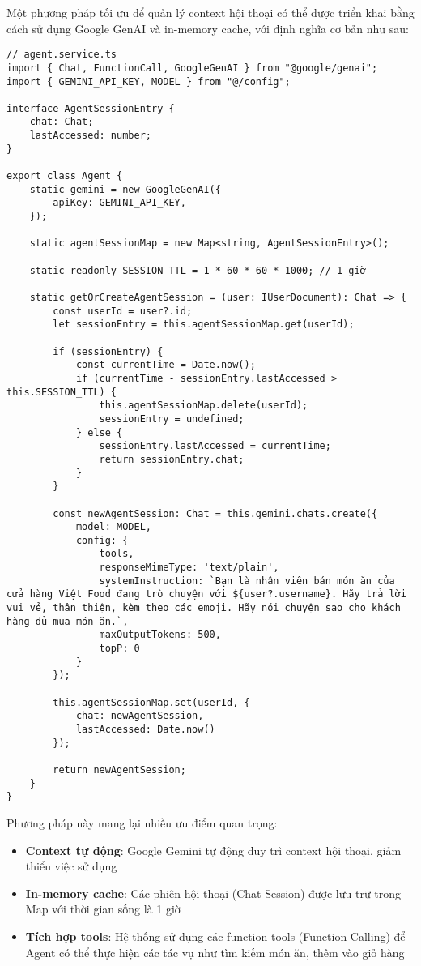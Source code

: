 Một phương pháp tối ưu để quản lý context hội thoại có thể được triển khai bằng cách sử dụng Google GenAI và in-memory cache, với định nghĩa cơ bản như sau:

\begin{verbatim}
// agent.service.ts
import { Chat, FunctionCall, GoogleGenAI } from "@google/genai";
import { GEMINI_API_KEY, MODEL } from "@/config";

interface AgentSessionEntry {
    chat: Chat;
    lastAccessed: number;
}

export class Agent {
    static gemini = new GoogleGenAI({
        apiKey: GEMINI_API_KEY,
    });

    static agentSessionMap = new Map<string, AgentSessionEntry>();

    static readonly SESSION_TTL = 1 * 60 * 60 * 1000; // 1 giờ

    static getOrCreateAgentSession = (user: IUserDocument): Chat => {
        const userId = user?.id;
        let sessionEntry = this.agentSessionMap.get(userId);

        if (sessionEntry) {
            const currentTime = Date.now();
            if (currentTime - sessionEntry.lastAccessed > this.SESSION_TTL) {
                this.agentSessionMap.delete(userId);
                sessionEntry = undefined;
            } else {
                sessionEntry.lastAccessed = currentTime;
                return sessionEntry.chat;
            }
        }

        const newAgentSession: Chat = this.gemini.chats.create({
            model: MODEL,
            config: {
                tools,
                responseMimeType: 'text/plain',
                systemInstruction: `Bạn là nhân viên bán món ăn của cửa hàng Việt Food đang trò chuyện với ${user?.username}. Hãy trả lời vui vẻ, thân thiện, kèm theo các emoji. Hãy nói chuyện sao cho khách hàng đủ mua món ăn.`,
                maxOutputTokens: 500,
                topP: 0
            }
        });

        this.agentSessionMap.set(userId, {
            chat: newAgentSession,
            lastAccessed: Date.now()
        });

        return newAgentSession;
    }
}
\end{verbatim}

Phương pháp này mang lại nhiều ưu điểm quan trọng:

\begin{itemize}
    \item \textbf{Context tự động}: Google Gemini tự động duy trì context hội thoại, giảm thiểu việc sử dụng
    \item \textbf{In-memory cache}: Các phiên hội thoại (Chat Session) được lưu trữ trong Map với thời gian sống là 1 giờ
    \item \textbf{Tích hợp tools}: Hệ thống sử dụng các function tools (Function Calling) để Agent có thể thực hiện các tác vụ như tìm kiếm món ăn, thêm vào giỏ hàng
\end{itemize}

